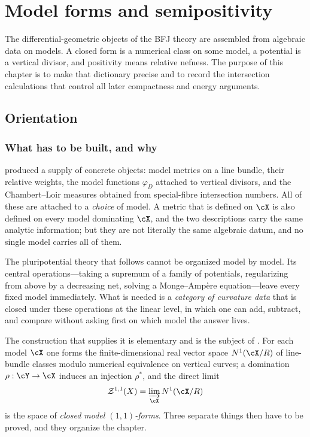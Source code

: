 \chapter{Model forms and semipositivity}
\label{chap:bfj-model-forms}

The differential-geometric objects of the BFJ theory are assembled from
algebraic data on models.  A closed form is a numerical class on some model,
a potential is a vertical divisor, and positivity means relative nefness.
The purpose of this chapter is to make that dictionary precise and to record
the intersection calculations that control all later compactness and energy
arguments.

\section{Orientation}
\label{sec:ch20-orientation}

\subsection{What has to be built, and why}
\label{sec:ch20-why}

 produced a supply of concrete objects: model metrics on a
line bundle, their relative weights, the model functions
$\varphi_D$ attached to vertical divisors, and the Chambert--Loir measures
obtained from special-fibre intersection numbers.  All of these are attached
to a \emph{choice} of model.  A metric that is defined on $\cX$ is also
defined on every model dominating $\cX$, and the two descriptions carry the
same analytic information; but they are not literally the same algebraic
datum, and no single model carries all of them.

The pluripotential theory that follows cannot be organized model by model.
Its central operations---taking a supremum of a family of potentials,
regularizing from above by a decreasing net, solving a Monge--Amp\`ere
equation---leave every fixed model immediately.  What is needed is a
\emph{category of curvature data} that is closed under these operations at
the linear level, in which one can add, subtract, and compare without asking
first on which model the answer lives.

The construction that supplies it is elementary and is the subject of
.  For each model $\cX$ one
forms the finite-dimensional real vector space $N^1(\cX/R)$ of line-bundle
classes modulo numerical equivalence on vertical curves; a domination
$\rho:\cY\to\cX$ induces an injection $\rho^*$, and the direct limit
\[
 \mathcal Z^{1,1}(X)=\varinjlim_{\cX}N^1(\cX/R)
\]
is the space of \emph{closed model $(1,1)$-forms}.  Three separate things
then have to be proved, and they organize the chapter.

